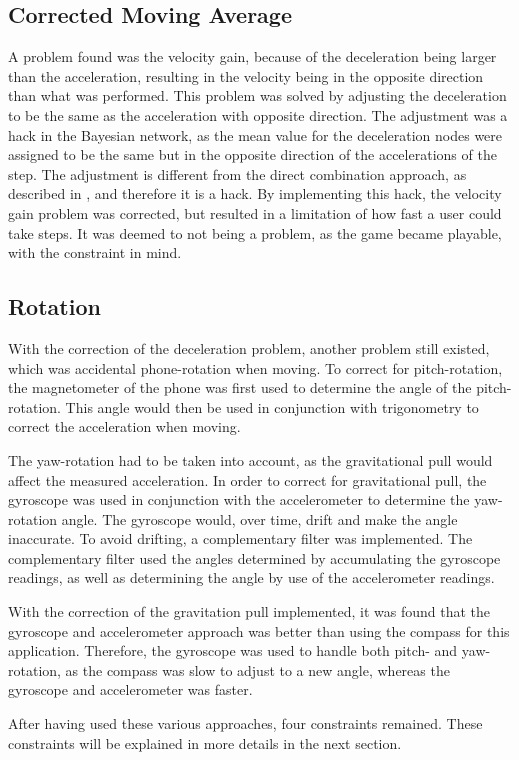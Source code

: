 \subsection*{Corrected Moving Average}
A problem found was the velocity gain, because of the deceleration being larger than the acceleration, resulting in the velocity being in the opposite direction than what was performed.
This problem was solved by adjusting the deceleration to be the same as the acceleration with opposite direction. 
The adjustment was a hack in the Bayesian network, as the mean value for the deceleration nodes were assigned to be the same but in the opposite direction of the accelerations of the step. 
The adjustment is different from the direct combination approach, as described in , and therefore it is a hack.
By implementing this hack, the velocity gain problem was corrected, but resulted in a limitation of how fast a user could take steps.
It was deemed to not being a problem, as the game became playable, with the constraint in mind.

\subsection*{Rotation}
With the correction of the deceleration problem, another problem still existed, which was accidental phone-rotation when moving.
To correct for pitch-rotation, the magnetometer of the phone was first used to determine the angle of the pitch-rotation.
This angle would then be used in conjunction with trigonometry to correct the acceleration when moving.

The yaw-rotation had to be taken into account, as the gravitational pull would affect the measured acceleration.
In order to correct for gravitational pull, the gyroscope was used in conjunction with the accelerometer to determine the yaw-rotation angle.
The gyroscope would, over time, drift and make the angle inaccurate.
To avoid drifting, a complementary filter was implemented.
The complementary filter used the angles determined by accumulating the gyroscope readings, as well as determining the angle by use of the accelerometer readings.

With the correction of the gravitation pull implemented, it was found that the gyroscope and accelerometer approach was better than using the compass for this application.
Therefore, the gyroscope was used to handle both pitch- and yaw-rotation, as the compass was slow to adjust to a new angle, whereas the gyroscope and accelerometer was faster.

After having used these various approaches, four constraints remained. 
These constraints will be explained in more details in the next section.
